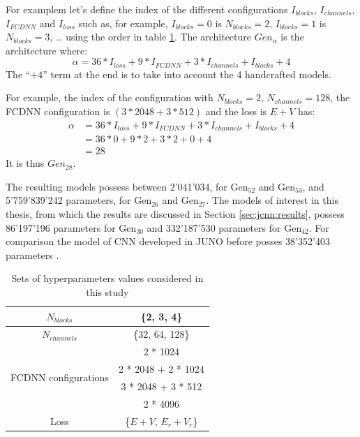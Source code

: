 \documentclass[../main.tex]{subfiles}
\begin{document}
For examplem let’s define the index of the different configurations $I_{blocks}$, $I_{channels}$, $I_{FCDNN}$ and $I_{loss}$ such as, for example, $I_{blocks} = 0$ is $N_{blocks} = 2$, $I_{blocks} = 1$ is $N_{blocks} = 3$, … using the order in table \ref{tab:jcnn:hyper}. The architecture $Gen_{\alpha}$ is the architecture where:
\begin{equation*}
\alpha = 36 * I_{loss} + 9 * I_{FCDNN} + 3 * I_{channels} + I_{blocks} + 4
\end{equation*}
The ``$+4$'' term at the end is to take into account the 4 handcrafted models.

For example, the index of the configuration with $N_{blocks} = 2$, $N_{channels} = 128$, the FCDNN configuration is $(3 * 2048 + 3 * 512)$ and the loss is $E + V$ has:
\begin{align*}
\alpha &= 36 * I_{loss} + 9 * I_{FCDNN} + 3 * I_{channels} + I_{blocks} + 4 \\
	     &= 36 * 0           + 9 * 2                 + 3 * 2                   + 0              + 4 \\
       &= 28
\end{align*}
It is thus $Gen_{28}$.

\hfill

The resulting models possess between 2'041'034, for $\mathrm{Gen}_{52}$ and $\mathrm{Gen}_{53}$, and  5'759'839'242 parameters, for $\mathrm{Gen}_{26}$ and $\mathrm{Gen}_{27}$. The models of interest in this thesis, from which the results are discussed in Section \ref{sec:jcnn:results}, possess 86'197'196 parameters for $\mathrm{Gen}_{30}$ and 332'187'530 parameters for $\mathrm{Gen}_{42}$. For comparison the model of CNN developed in JUNO before posses 38'352'403 parameters \cite{qian_vertex_2021}.

\begin{table}[ht]
  \centering
  \begin{tabular}{ | c | c | }
    \hline $N_{blocks}$ & \{2, 3, 4\} \\
    \hline $N_{channels}$ & \{32, 64, 128\} \\
    \hline
    \multirow{4}{*}{FCDNN configurations} & 2 * 1024 \\
                                        & 2 * 2048 + 2 * 1024 \\
                                        & 3 * 2048 + 3 * 512 \\
                                        & 2 * 4096 \\
    \hline
    Loss & \{$E+V$, $E_r + V_r$\} \\
    \hline
  \end{tabular}
  \caption{Sets of hyperparameters values considered in this study}
  \label{tab:jcnn:hyper}
\end{table}
\end{document}
